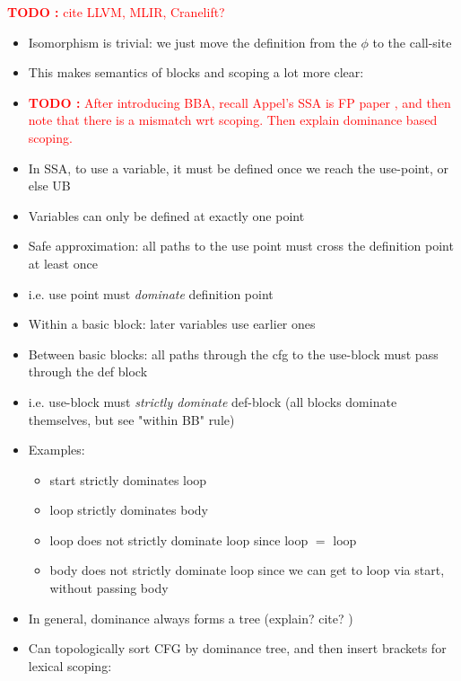\documentclass[acmsmall,screen,review]{acmart}
\newcounter{todos}
\newcommand{\TODO}[1]{{
  \stepcounter{todos}
  \begin{center}\large{\textcolor{red}{\textbf{TODO \arabic{todos}:} #1}}\end{center}
}}
\begin{document}
\TODO{cite LLVM, MLIR, Cranelift?}

\begin{itemize}
  \item Isomorphism is trivial: we just move the definition from the $\phi$ to the call-site
  \item This makes semantics of blocks and scoping a lot more clear:
  \item {\TODO{After introducing BBA, recall Appel's SSA is FP paper \cite{appel-ssa}, and then note
    that there is a mismatch wrt scoping. Then explain dominance based scoping.}}
  \item In SSA, to use a variable, it must be defined once we reach the use-point, or else UB
  \item Variables can only be defined at exactly one point
  \item Safe approximation: all paths to the use point must cross the definition point at least once
  \item i.e. use point must \textit{dominate} definition point
  \item Within a basic block: later variables use earlier ones
  \item Between basic blocks: all paths through the cfg to the use-block must pass through the def
        block
  \item i.e. use-block must \textit{strictly dominate} def-block (all blocks dominate themselves,
  but see "within BB" rule)
  \item Examples: \begin{itemize}
    \item start strictly dominates loop
    \item loop strictly dominates body
    \item loop does not strictly dominate loop since loop $=$ loop
    \item body does not strictly dominate loop since we can get to loop via start, without passing
    body
  \end{itemize}
  \item In general, dominance always forms a tree (explain? cite? \cite{ssa-intro})
  \item Can topologically sort CFG by dominance tree, and then insert brackets for lexical scoping:
\end{itemize}
\end{document}

